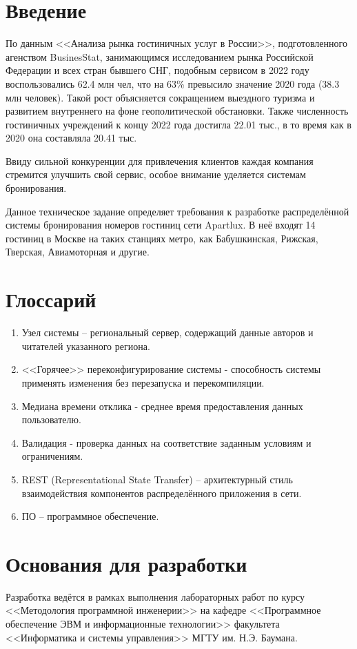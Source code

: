 \section*{Введение}
По данным <<Анализа рынка гостиничных услуг в России>>, подготовленного агенством BusinesStat, занимающимся исследованием рынка Российской Федерации и всех стран бывшего СНГ, подобным сервисом в 2022 году воспользовались 62.4 млн чел, что на 63\% превысило значение 2020 года (38.3 млн человек). Такой рост объясняется сокращением выездного туризма и развитием внутреннего на фоне геополитической обстановки. Также численность гостиничных учреждений к концу 2022 года достигла 22.01 тыс., в то время как в 2020 она составляла 20.41 тыс. 

Ввиду сильной конкуренции для привлечения клиентов каждая компания стремится улучшить свой сервис, особое внимание уделяется системам бронирования.

Данное техническое задание определяет требования к разработке распределённой системы бронирования номеров гостиниц сети Apartlux. В неё входят 14 гостиниц в Москве на таких станциях метро, как Бабушкинская, Рижская, Тверская, Авиамоторная и другие.

\section*{Глоссарий}
\begin{enumerate}
	\item Узел системы -- региональный сервер, содержащий данные авторов и читателей указанного региона.
	
	\item <<Горячее>> переконфигурирование системы - способность системы применять изменения без перезапуска и перекомпиляции.
	
	\item Медиана времени отклика - среднее время предоставления данных пользователю.
	
	\item Валидация - проверка данных на соответствие заданным условиям и ограничениям.
	
	\item REST (Representational State Transfer) -- архитектурный стиль взаимодействия компонентов распределённого приложения в сети. 
	
	\item ПО -- программное обеспечение.
\end{enumerate}

\section*{Основания для разработки}
Разработка ведётся в рамках выполнения лабораторных работ по курсу <<Методология программной инженерии>> на кафедре <<Программное обеспечение ЭВМ и информационные технологии>> факультета <<Информатика и системы управления>> МГТУ им. Н.Э. Баумана.

